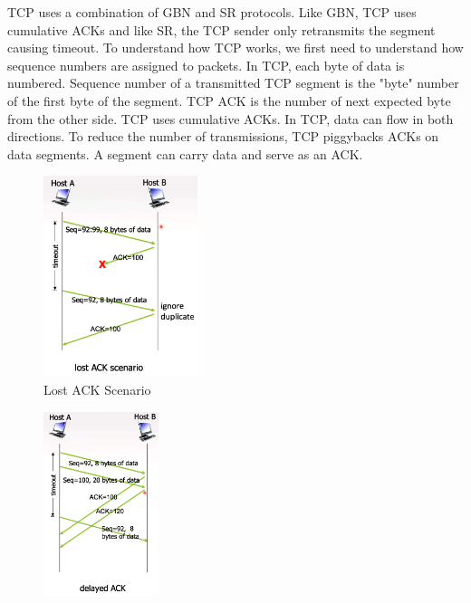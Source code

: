 \documentclass[a4paper]{article}
\theoremstyle{plain}
\theoremstyle{definition}
\newtheorem{defn}{Definition}[section]
\theoremstyle{remark}
\begin{document}
\begin{tcolorbox}[colback=black!3!white,colframe=black!60!white,breakable,enhanced,title=\begin{defn}TCP reliable data transfer \label{TCP reliable data transfer}\end{defn}]
TCP uses a combination of GBN and SR protocols. Like GBN, TCP uses cumulative ACKs and like SR, the TCP sender only retransmits the segment causing timeout. To understand how TCP works, we first need to understand how sequence numbers are assigned to packets. In TCP, each byte of data is numbered. Sequence number of a transmitted TCP segment is the "byte" number of the first byte of the segment. TCP ACK is the number of next expected byte from the other side. TCP uses cumulative ACKs. In TCP, data can flow in both directions. To reduce the number of transmissions, TCP piggybacks ACKs on data segments. A segment can carry data and serve as an ACK. 
\begin{figure}[H]
	\centering
	\includegraphics[width=0.4\textwidth]{sixtyone.png}
	\caption{Lost ACK Scenario}
	\label{fig:sixtyone-png}
\end{figure}
\begin{figure}[H]
	\centering
	\includegraphics[width=0.3\textwidth]{sixtytwo.png}

\end{figure}
\end{tcolorbox}
\end{document}
